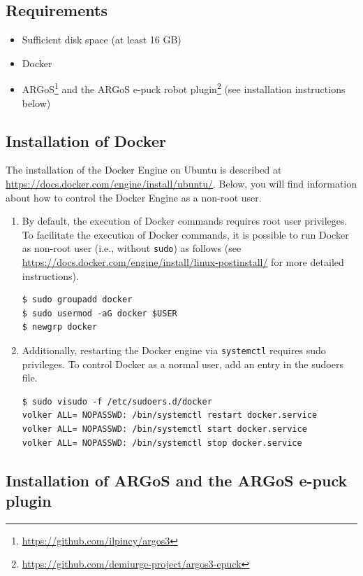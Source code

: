 \documentclass{article}
\begin{document}
\subsection{Requirements}
\begin{itemize}
\item Sufficient disk space (at least 16 GB)
\item Docker 
\item ARGoS\footnote{\url{https://github.com/ilpincy/argos3}} and the
  ARGoS e-puck robot
  plugin\footnote{\url{https://github.com/demiurge-project/argos3-epuck}}
  (see installation instructions below)
\end{itemize}

\subsection{Installation of Docker}

The installation of the Docker Engine on Ubuntu is described at
\url{https://docs.docker.com/engine/install/ubuntu/}. Below, you will
find information about how to control the Docker Engine as a non-root
user.

\begin{enumerate}[leftmargin=*]
\item By default, the execution of Docker commands requires root user
  privileges. To facilitate the execution of Docker commands, it is
  possible to run Docker as non-root user (i.e., without
  \texttt{sudo}) as follows (see
  \url{https://docs.docker.com/engine/install/linux-postinstall/} for
  more detailed instructions).
\begin{verbatim}
$ sudo groupadd docker
$ sudo usermod -aG docker $USER
$ newgrp docker
\end{verbatim}

\item Additionally, restarting the Docker engine via \verb|systemctl|
  requires sudo privileges. To control Docker as a normal user, add an
  entry in the sudoers file.
\begin{verbatim}
$ sudo visudo -f /etc/sudoers.d/docker
volker ALL= NOPASSWD: /bin/systemctl restart docker.service
volker ALL= NOPASSWD: /bin/systemctl start docker.service
volker ALL= NOPASSWD: /bin/systemctl stop docker.service
\end{verbatim}
\end{enumerate}
  
 \subsection{Installation of ARGoS and the ARGoS e-puck plugin}
\end{document}
